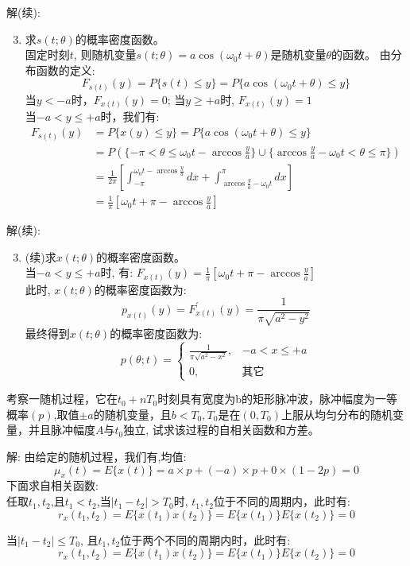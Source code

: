 \begin{frame}
解(续):
\begin{enumerate}
\setcounter{enumi}{2} %
\item 求$s(t;\theta)$的概率密度函数。\\
固定时刻$t$, 则随机变量$s(t;\theta)=a\cos(\omega_0t+\theta)$是随机变量$\theta$的函数。
由分布函数的定义:
$$F_{s(t)}(y)=P\{s(t)\le y\}=P\{a\cos(\omega_0t+\theta)\le y \}$$
当$y<-a$时，$F_{x(t)}(y)=0$; 当$y\ge +a$时, $F_{x(t)}(y)=1$\\
当$-a<y\le +a$时，我们有:
\begin{align*}
F_{s(t)}(y) &=P\{x(y)\le y \}=P\{a\cos(\omega_0t+\theta)\le y \}\\
&=P(\{-\pi<\theta\le\omega_0t-\arccos\frac{y}{a} \} \cup \{\arccos\frac{y}{a}-\omega_0t<\theta\le\pi \})\\
&=\frac{1}{2\pi}\left[\int_{-\pi}^{\omega_0t-\arccos\frac{y}{a}}dx+\int_{\arccos\frac{y}{a}-\omega_0t}^{\pi}dx\right]\\
&=\frac{1}{\pi}[\omega_0t+\pi-\arccos\frac{y}{a}]
\end{align*}	
\end{enumerate}
\end{frame}

\begin{frame}
解(续):
\begin{enumerate}
\setcounter{enumi}{2} %
\item (续)求$x(t;\theta)$的概率密度函数。\\
当$-a<y\le +a$时, 有: $F_{x(t)}(y)=\frac{1}{\pi}[\omega_0t+\pi-\arccos\frac{y}{a}]$\\
此时, $x(t;\theta)$的概率密度函数为:
$$p_{x(t)}(y)=F_{x(t)}^\prime(y)=\frac{1}{\pi\sqrt{a^2-y^2}} $$
最终得到$x(t;\theta)$的概率密度函数为:
$$ p(\theta;t)=
\begin{cases}
\frac{1}{\pi\sqrt{a^2-x^2}}, &-a<x\le +a \\
0,&\text{其它}
\end{cases}
$$
\end{enumerate}
\end{frame}

\begin{frame}
\begin{example}
	考察一随机过程，它在$t_0+nT_0$时刻具有宽度为b的矩形脉冲波，脉冲幅度为一等概率$(p)$,取值$\pm a$的随机变量，且$b<T_0,T_0$是在$(0,T_0)$上服从均匀分布的随机变量，并且脉冲幅度$A$与$t_0$独立, 试求该过程的自相关函数和方差。
\end{example}
解: 由给定的随机过程，我们有,均值: 
$$\mu_x(t)=E\{x(t)\}=a\times p+(-a)\times p + 0\times(1-2p)=0$$
下面求自相关函数:\\
任取$t_1,t_2$,且$t_1<t_2$,当$|t_1-t_2|>T_0$时, $t_1,t_2$位于不同的周期内，此时有:
$$r_x(t_1,t_2)=E\{x(t_1)x(t_2)\}=E\{x(t_1)\}E\{x(t_2)\}=0$$

当$|t_1-t_2|\le T_0$, 且$t_1,t_2$位于两个不同的周期内时，此时有:
$$r_x(t_1,t_2)=E\{x(t_1)x(t_2)\}=E\{x(t_1)\}E\{x(t_2)\}=0$$
\end{frame}

